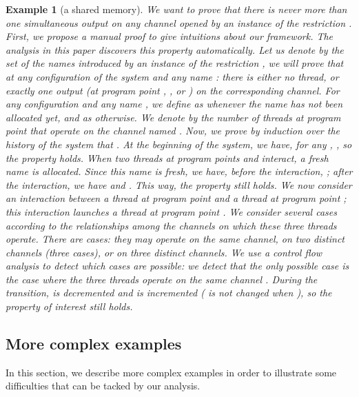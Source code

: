 \documentclass{article}
\newcommand{\boxexample}{}
\newtheorem{example}[thm]{Example}
\newcommand{\pp}[1]{}
\newcommand{\memlaba}{1}
\newcommand{\memlabb}{2}
\newcommand{\memlabf}{6}
\newcommand{\memlabj}{10}
\newcommand{\memlabm}{13}
\begin{document}
{\begin{example}[a shared memory]
We want to prove that there is never more than one simultaneous output on any channel  opened by an instance of the restriction .
First, we propose a manual proof to give intuitions about our framework.
The analysis in this paper discovers this property automatically.
Let us denote by  the set of the names introduced by an instance of the restriction , we will prove that at any configuration of the system and any name : there is either no thread, or exactly one output (at program point \pp{\memlabb}, \pp{\memlabf}, or \pp{\memlabj}) on the corresponding channel.
For any configuration  and any name , we define  as  whenever the name  has not been allocated yet, and as  otherwise. We denote by  the number of threads at program point  that operate on the channel named . 
Now, we prove by induction over the history of the system that . At the beginning of the system, we have, for any , , so the property holds. 
When two threads at program points \pp{\memlaba} and \pp{\memlabm} interact, a fresh name  is allocated. Since this name is fresh, we have, before the interaction, ; after the interaction,  we have  and . This way, the property still holds. 
We now consider an interaction  between a thread  at program point  and a thread  at program point ; 
this interaction launches a thread at program point .
We consider  several cases according to the relationships among the channels on which these three threads operate. 
There are  cases: they may operate on the same channel, on two distinct channels (three cases), or on three distinct channels. 
We use a control flow analysis to detect which cases are possible: we detect that the only possible case is the case where the three threads operate on the same channel . 
During the transition,  is decremented and  is incremented ( is not changed when ), so the property of interest  still holds.\boxexample
\end{example}}

\subsection{More complex examples}

In this section, 
we describe more complex examples in order to illustrate some difficulties that can be tacked by our analysis.
\end{document}
